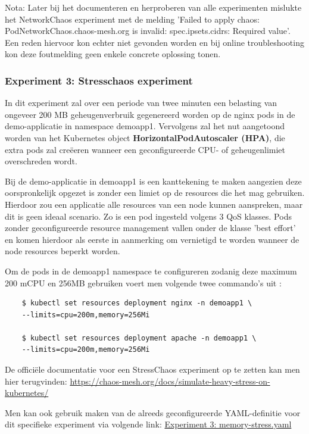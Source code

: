 Nota: Later bij het documenteren en herproberen van alle experimenten mislukte het NetworkChaos experiment met de melding 'Failed to apply chaos: PodNetworkChaos.chaos-mesh.org is invalid: spec.ipsets.cidrs: Required value'. \newline Een reden hiervoor kon echter niet gevonden worden en bij online troubleshooting kon deze foutmelding geen enkele concrete oplossing tonen.  

\subsubsection{Experiment 3: Stresschaos experiment}

In dit experiment zal over een periode van twee minuten een belasting van ongeveer 200 MB geheugenverbruik gegenereerd worden op de nginx pods in de demo-applicatie in namespace demoapp1. Vervolgens zal het nut aangetoond worden van het Kubernetes object {\bf HorizontalPodAutoscaler (HPA)}, die extra pods zal creëeren wanneer een geconfigureerde CPU- of geheugenlimiet overschreden wordt.

Bij de demo-applicatie in demoapp1 is een kanttekening te maken aangezien deze oorspronkelijk opgezet is zonder een limiet op de resources die het mag gebruiken. Hierdoor zou een applicatie alle resources van een node kunnen aanspreken, maar dit is geen ideaal scenario. Zo is een pod ingesteld volgens 3 QoS klasses. Pods zonder geconfigureerde resource management vallen onder de klasse 'best effort' en komen hierdoor als eerste in aanmerking om vernietigd te worden wanneer de node resources beperkt worden. \autocite{Tatiyana2020}

Om de pods in de demoapp1 namespace te configureren zodanig deze maximum 200 mCPU en 256MB gebruiken voert men volgende twee commando's uit \autocite{Kubernetes2022c}: 
\begin{lstlisting}
    $ kubectl set resources deployment nginx -n demoapp1 \
    --limits=cpu=200m,memory=256Mi
    
    $ kubectl set resources deployment apache -n demoapp1 \
    --limits=cpu=200m,memory=256Mi
\end{lstlisting}

De officiële documentatie voor een StressChaos experiment op te zetten kan men hier terugvinden: \url{https://chaos-mesh.org/docs/simulate-heavy-stress-on-kubernetes/}

Men kan ook gebruik maken van de alreeds geconfigureerde YAML-definitie voor dit specifieke experiment via volgende link: \href{https://github.com/KenBruggeman/BP_21-22/blob/master/bachelorproef/docs/chaosmesh-experimenten/memory-stress.yaml}{Experiment 3: memory-stress.yaml}

